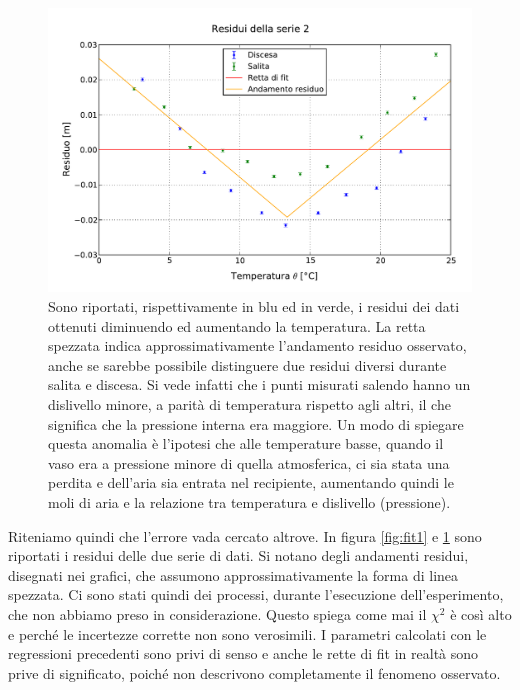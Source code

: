 \begin{figure}[p]
    \centering
    \includegraphics[width=117mm]{immagini/fit2.pdf}
    \caption{Sono riportati, rispettivamente in blu ed in verde, i residui dei dati ottenuti diminuendo ed aumentando la temperatura.
    La retta spezzata indica approssimativamente l'andamento residuo osservato, anche se sarebbe possibile distinguere due residui
    diversi durante salita e discesa. Si vede infatti che i punti misurati salendo hanno un dislivello minore, a parità di temperatura
    rispetto agli altri, il che significa che la pressione interna era maggiore. Un modo di spiegare questa anomalia è l'ipotesi che
    alle temperature basse, quando il vaso era a pressione minore di quella atmosferica, ci sia stata una perdita e dell'aria sia entrata
    nel recipiente, aumentando quindi le moli di aria e la relazione tra temperatura e dislivello (pressione).}
    \label{fig:fit2}
\end{figure}

Riteniamo quindi che l'errore vada cercato altrove. In figura \ref{fig:fit1} e \ref{fig:fit2} sono riportati i residui delle due
serie di dati. Si notano degli andamenti residui, disegnati nei grafici, che assumono approssimativamente la forma di linea spezzata.
Ci sono stati quindi dei processi, durante l'esecuzione dell'esperimento, che non abbiamo preso in considerazione.
Questo spiega come mai il $\chi^2$ è così alto e perché le incertezze corrette non sono verosimili. I parametri calcolati con
le regressioni precedenti sono privi di senso e anche le rette di fit in realtà sono prive di significato, poiché non
descrivono completamente il fenomeno osservato.
